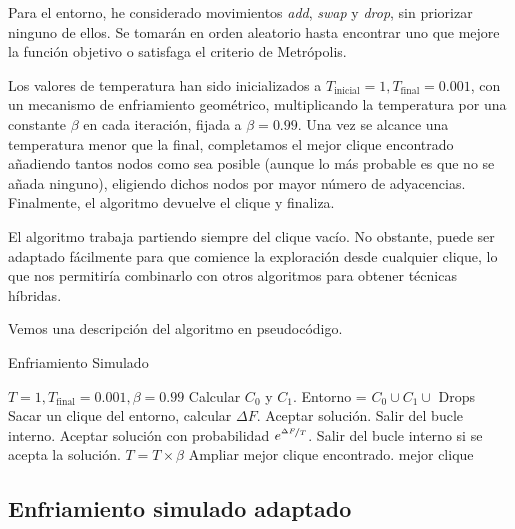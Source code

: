 Para el entorno, he considerado movimientos \textit{add}, \textit{swap} y \textit{drop},
sin priorizar ninguno de ellos. Se tomarán en orden aleatorio hasta encontrar uno que
mejore la función objetivo o satisfaga el criterio de Metrópolis.

Los valores de temperatura han sido inicializados a $T_{\text{inicial}} = 1,
T_{\text{final}} = 0.001$, con un mecanismo de enfriamiento geométrico, multiplicando
la temperatura por una constante $\beta$ en cada iteración, fijada a $\beta = 0.99$.
Una vez se alcance una temperatura menor que la final, completamos el mejor clique
encontrado añadiendo tantos nodos como sea posible (aunque lo más probable es que
no se añada ninguno), eligiendo dichos nodos por mayor número de adyacencias.
Finalmente, el algoritmo devuelve el clique y finaliza.

El algoritmo trabaja partiendo siempre del clique vacío. No obstante, puede ser
adaptado fácilmente para que comience la exploración desde cualquier clique, lo
que nos permitiría combinarlo con otros algoritmos para obtener técnicas híbridas.

Vemos una descripción del algoritmo en pseudocódigo.

\begin{algorithm}[H]
\caption{Enfriamiento Simulado}
  \begin{algorithmic}
    \State $T = 1, T_{\text{final}} = 0.001, \beta = 0.99$
    \State Calcular $C_0$ y $C_1$.
    \Repeat
      \State Entorno = $C_0 \cup C_1 \cup$ Drops
      \Repeat
        \State Sacar un clique del entorno, calcular $\Delta F$.
          \State Aceptar solución.
          \State Salir del bucle interno.
        \Else
          \State Aceptar solución con probabilidad $e^{\nicefrac{\Delta F}{T}}$.
          \State Salir del bucle interno si se acepta la solución.
        \EndIf
      \State $T = T \times \beta$
    \State Ampliar mejor clique encontrado.
    \Return mejor clique
    \EndFunction
  \end{algorithmic}
\end{algorithm}

\subsection{Enfriamiento simulado adaptado}\label{enfriamiento2}

